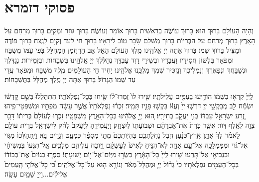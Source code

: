 

\chapter[פסוקי דזמרא]{ פסוקי דזמרא }

\chanukat

\mournerskaddish

וְהָיָה הָעוֹלָם בָּרוּךְ הוּא׃
בָּרוּךְ עוֹשֶׂה בְרֵאשִׁית בָּרוּךְ אוֹמֵר וְעוֹשֶׂה׃
בָּרוּךְ גּוֹזֵר וּמְקַיֵּם בָּרוּךְ מְרַחֵם עַל הָאָֽרֶץ׃
בָּרוּךְ מְרַחֵם עַל הַבְּרִיּוֹת בָּרוּךְ מְשַׁלֵּם שָׂכָר טוֹב לִירֵאָיו׃
בָּרוּךְ חַי לָעַד וְקַיָּם לָנֶֽצַח בָּרוּךְ פּוֹדֶה וּמַצִּיל בָּרוּךְ שְׁמוֹ׃
בָּרוּךְ אַתָּה יְיָ אֱלֹהֵֽינוּ מֶֽלֶךְ הָעוֹלָם הָאֵל אָב הָרַחֲמָן הַמְהֻלָּל בְּפִי עַמּוֹ מְשֻׁבָּח וּמְפֹאָר בִּלְשׁוֹן חֲסִידָיו וַעֲבָדָיו וּבְשִׁירֵי דָוִד עַבְדֶּֽךָ נְהַלֶּלְךָ יְיָ אֱלֹהֵֽינוּ בִּשְׁבָחוֹת וּבִזְמִירוֹת׃ נְגַדֶּלְךָ וּנְשַׁבֵּחֲךָ וּנְפָאֶרְךָ וְנַמְלִיכְךָ וְנַזְכִּיר שִׁמְךָ מַלְכֵּֽנוּ אֱלֹהֵֽינוּ׃
יָחִיד חֵי הָעוֹלָמִים מֶֽלֶךְ מְשֻׁבָּח וּמְפֹאָר עֲדֵי עַד שְׁמוֹ הַגָּדוֹל׃ בָּרוּךְ אַתָּה יְיָ מֶֽלֶךְ מְהֻלָּל בַּתֻּשְׁבָּחוֹת׃

לַֽייָ֙ קִרְא֣וּ בִשְׁמ֔וֹ
הוֹדִ֥יעוּ בָעַמִּ֖ים עֲלִילֹתָֽיו׃
שִׁ֤ירוּ לוֹ֙ זַמְּרוּ־ל֔וֹ שִׂ֖יחוּ בְּכׇל־נִפְלְאֹתָֽיו׃
הִֽתְהַלְלוּ֙ בְּשֵׁ֣ם קׇדְשׁ֔וֹ יִשְׂמַ֕ח לֵ֖ב מְבַקְשֵׁ֥י יְיָ׃
דִּרְשׁ֤וּ יְיָ֙ וְעֻזּ֔וֹ בַּקְּשׁ֥וּ פָנָ֖יו תָּמִֽיד׃
זִכְר֗וּ נִפְלְאֹתָיו֙ אֲשֶׁ֣ר עָשָׂ֔ה מֹפְתָ֖יו וּמִשְׁפְּטֵי־פִֽיהוּ׃
זֶ֚רַע יִשְׂרָאֵ֣ל עַבְדּ֔וֹ בְּנֵ֥י יַעֲקֹ֖ב בְּחִירָֽיו׃
ה֚וּא יְיָ֣ אֱלֹהֵ֔ינוּ בְּכׇל־הָאָ֖רֶץ מִשְׁפָּטָֽיו׃
זִכְר֤וּ לְעוֹלָם֙ בְּרִית֔וֹ דָּבָ֥ר צִוָּ֖ה לְאֶ֥לֶף דּֽוֹר׃
אֲשֶׁ֤ר כָּרַת֙ אֶת־אַבְרָהָ֔ם וּשְׁבוּעָת֖וֹ לְיִצְחָֽק׃
וַיַּעֲמִידֶ֤הָ לְיַֽעֲקֹב֙ לְחֹ֔ק לְיִשְׂרָאֵ֖ל בְּרִ֥ית עוֹלָֽם׃
לֵאמֹ֗ר לְךָ֙ אֶתֵּ֣ן אֶֽרֶץ־כְּנָ֔עַן חֶ֖בֶל נַחֲלַתְכֶֽם׃
בִּהְיֽוֹתְכֶם֙ מְתֵ֣י מִסְפָּ֔ר כִּמְעַ֖ט וְגָרִ֥ים בָּֽהּ׃
וַיִּֽתְהַלְּכוּ֙ מִגּ֣וֹי אֶל־גּ֔וֹי וּמִמַּמְלָכָ֖ה אֶל־עַ֥ם אַחֵֽר׃
לֹֽא־הִנִּ֤יחַ לְאִישׁ֙ לְעׇשְׁקָ֔ם וַיּ֥וֹכַח עֲלֵיהֶ֖ם מְלָכִֽים׃
אַֽל־תִּגְּעוּ֙ בִּמְשִׁיחָ֔י וּבִנְבִיאַ֖י אַל־תָּרֵֽעוּ׃
שִׁ֤ירוּ לַֽייָ֙ כׇּל־הָאָ֔רֶץ בַּשְּׂר֥וּ מִיּֽוֹם־אֶל־י֖וֹם יְשׁוּעָתֽוֹ׃
סַפְּר֤וּ בַגּוֹיִם֙ אֶת־כְּבוֹד֔וֹ בְּכׇל־הָעַמִּ֖ים נִפְלְאֹתָֽיו׃
כִּי֩ גָד֨וֹל יְיָ֤ וּמְהֻלָּל֙ מְאֹ֔ד וְנוֹרָ֥א ה֖וּא עַל־כׇּל־אֱלֹהִֽים׃
כִּ֠י כׇּל־אֱלֹהֵ֤י הָֽעַמִּים֙ אֱלִילִ֔ים...וַייָ֖ שָׁמַ֥יִם עָשָֽׂה׃

